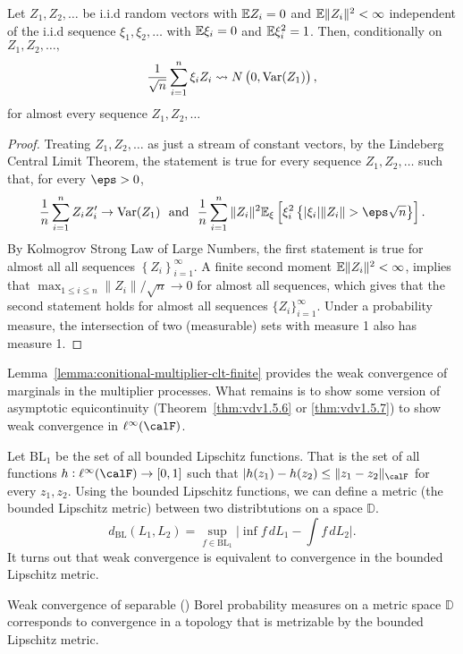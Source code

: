 \begin{lemma}
	\label{lemma:conitional-multiplier-clt-finite}
	Let \(Z_1,Z_2,\dots\) be i.i.d random vectors with \(\mathbb{E} Z_i =0\) and \(\mathbb{E}\|Z_i\|^2 <\infty\) independent of the i.i.d sequence \(\xi_1,\xi_2,\dots\) with \(\mathbb{E}\xi_i=0\) and \(\mathbb{E}\xi_i^2=1\). Then, conditionally on \(Z_1,Z_2,\dots,\)
	\[
		\frac{1}{\sqrt{n}}\sum_{i=1}^n \xi_iZ_i\rightsquigarrow N\left(0, \operatorname{Var}(Z_1)\right)
	,\]
	for almost every sequence \(Z_1,Z_2,\dots\)
\end{lemma}
\begin{proof}
	Treating \(Z_1,Z_2,\dots\) as just a stream of constant vectors, by the Lindeberg Central Limit Theorem, the statement is true for every sequence \(Z_1,Z_2,\dots\) such that, for every \(\eps > 0\),
	\[
		\frac{1}{n} \sum_{i=1}^n Z_iZ_i'\to \Var(Z_1)\andbox \frac{1}{n}\sum_{i=1}^n \|Z_i\|^2\E_\xi\left[\xi_i^2\left\{|\xi_i|\|Z_i\| > \eps\sqrt{n}\right\}\right]
	.\]
	By Kolmogrov Strong Law of Large Numbers, the first statement is true for almost all all sequences \(\left\{Z_i\right\}_{i=1}^\infty\). A finite second moment \(\mathbb{E}\|Z_i\|^2 <\infty\), implies that \(\max_{1\leq i\leq n}\|Z_i\|/\sqrt{n}\to0\) for almost all sequences, which gives that the second statement holds for almost all sequences \(\{Z_i\}_{i=1}^\infty\). Under a probability measure, the intersection of two (measurable) sets with measure 1 also has measure 1.
\end{proof}

Lemma~\ref{lemma:conitional-multiplier-clt-finite} provides the weak convergence of marginals in the multiplier processes. What remains is to show some version of asymptotic equicontinuity (Theorem~\ref{thm:vdv1.5.6} or \ref{thm:vdv1.5.7}) to show weak convergence in \(\ell^\infty(\calF)\). 

Let \(\text{BL}_1\) be the set of all bounded Lipschitz functions. That is the set of all functions \(h:\ell^\infty(\calF)\to[0,1]\) such that \(|h(z_1)-h(z_2)\leq \|z_1-z_2\|_\calF\) for every \(z_1,z_2\). Using the bounded Lipschitz functions, we can define a metric (the bounded Lipschitz metric) between two distribtutions on a space \(\mathbb{D}\). 
\[
	d_{\text{BL}}(L_1,L_2) = \sup_{f\in \text{BL}_1} \bigg|\inf f\,dL_1 - \int f\,dL_2\bigg|
.\] 
It turns out that weak convergence is equivalent to convergence in the bounded Lipschitz metric. 
\begin{theorem}
	\label{thm:weak-convergence-bounded-lipschits}
	Weak convergence of separable () Borel probability measures on a metric space \(\mathbb{D}\) corresponds to convergence in a topology that is metrizable by the bounded Lipschitz metric.
\end{theorem}

